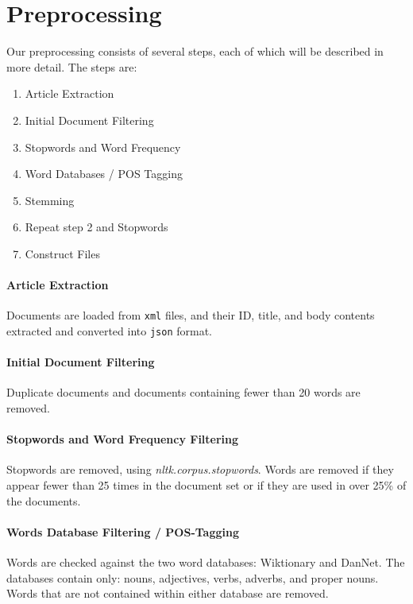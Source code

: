 \section{Preprocessing}\label{sec:prepro}

Our preprocessing consists of several steps, each of which will be described in more detail.
The steps are:
\begin{enumerate}
	\item Article Extraction
	\item Initial Document Filtering
	\item Stopwords and Word Frequency
	\item Word Databases / POS Tagging
	\item Stemming
	\item Repeat step 2 and Stopwords
	\item Construct Files
\end{enumerate}

\paragraph{Article Extraction}
Documents are loaded from \texttt{xml} files, and their ID, title, and body contents extracted and converted into \texttt{json} format.

\paragraph{Initial Document Filtering}
Duplicate documents and documents containing fewer than 20 words are removed.

\paragraph{Stopwords and Word Frequency Filtering}
Stopwords are removed, using \emph{nltk.corpus.stopwords}. 
Words are removed if they appear fewer than 25 times in the document set or if they are used in over 25\% of the documents.

\paragraph{Words Database Filtering / POS-Tagging}
Words are checked against the two word databases: Wiktionary and DanNet. 
The databases contain only: nouns, adjectives, verbs, adverbs, and proper nouns. 
Words that are not contained within either database are removed.

